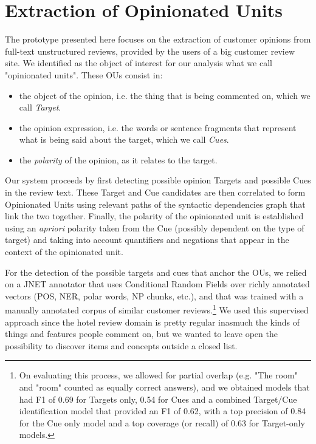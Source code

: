 \documentclass{llncs}
\begin{document}
\section{Extraction of Opinionated Units}

The prototype presented here focuses on the extraction of customer opinions from full-text unstructured reviews, provided by the users of a big customer review site. We identified as the object of interest for our analysis what we call "opinionated units". These OUs consist in:
\begin{itemize}
\item the object of the opinion, i.e. the thing that is being commented on, which we call \emph{Target}.
\item the opinion expression, i.e. the words or sentence fragments that represent what is being said about the target, which we call \emph{Cues}.
\item the \emph{polarity} of the opinion, as it relates to the target.
\end{itemize}

Our system proceeds by first detecting possible opinion Targets and possible Cues in the review text. These Target and Cue candidates are then correlated to form Opinionated Units using relevant paths of the  syntactic dependencies graph that link the two together. Finally, the polarity of the opinionated unit is established using an \emph{apriori} polarity taken from the Cue (possibly dependent on the type of target) and taking into account quantifiers and negations that appear in the context of the opinionated unit.

For the detection of the possible targets and cues that anchor the OUs, we relied on a JNET annotator that uses Conditional Random Fields over richly annotated vectors (POS, NER, polar words, NP chunks, etc.), and that was trained with a manually annotated corpus of similar customer reviews.\footnote{On evaluating this process, we allowed for partial overlap (e.g. "The room" and "room" counted as equally correct answers), and we obtained models that had F1 of 0.69 for  Targets only, 0.54 for Cues and a combined Target/Cue identification model that provided an F1 of 0.62, with a top precision of 0.84 for the Cue only model and a top coverage (or recall) of 0.63 for Target-only models.} We used this supervised approach since the hotel review domain is pretty regular inasmuch the kinds of things and features people comment on, but we wanted to leave open the possibility to discover items and concepts outside a closed list.
\end{document}
